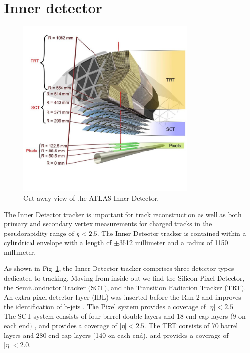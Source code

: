 \section{Inner detector}
\label{sec:inner}
\begin{figure}[htbp]
 \begin{center}
 \includegraphics[width=0.8\textwidth]{chapters/c4/figures/inner}
 \end{center}
 \caption{Cut-away view of the ATLAS Inner Detector.}
 \label{fig:inner}
\end{figure}

\par The Inner Detector tracker is important for track reconstruction as well as both primary and secondary vertex measurements for charged tracks in the pseudorapidity range of $ \eta< 2.5$. The Inner Detector tracker is contained within a cylindrical envelope with a length of $\pm$3512 millimeter and a radius of 1150 millimeter.

\par As shown in Fig~\ref{fig:inner}, the Inner Detector tracker comprises three detector types dedicated to tracking. Moving from inside out we find the Silicon Pixel Detector, the SemiConductor Tracker (SCT), and the Transition Radiation Tracker (TRT). An extra pixel detector layer (IBL)\cite{Capeans:1291633} was inserted before the Run 2 and improves the identification of b-jets \cite{ATL-PHYS-PUB-2015-022}. The Pixel system provides a coverage of $|\eta|<2.5$. The SCT system consists of four barrel double layers and 18 end-cap layers (9 on each end) \cite{Aad:2014mta}, and provides a coverage of $|\eta| < 2.5$. The TRT consists of 70 barrel layers and 280 end-cap layers (140 on each end), and provides a coverage of $|\eta| < 2.0$\cite{Aad:2014mta}.

